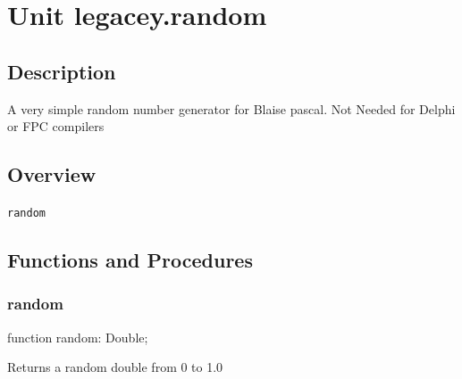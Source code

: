 \documentclass{report}
\newif\ifpdf
\begin{document}
\label{toc}\tableofcontents
\newpage
\newlength{\tmplength}
\chapter{Unit legacey.random}
\label{legacey.random}
\section{Description}
A very simple random number generator for Blaise pascal. Not Needed for Delphi or FPC compilers
\section{Overview}
\begin{description}
\item[\texttt{random}]
\end{description}
\section{Functions and Procedures}
\ifpdf
\subsection*{\large{\textbf{random}}\normalsize\hspace{1ex}\hrulefill}
\else
\subsection*{random}
\fi
\label{legacey.random-random}
\begin{list}{}{
\setlength{\itemindent}{0cm}
\setlength{\listparindent}{0cm}
\setlength{\leftmargin}{\evensidemargin}
\addtolength{\leftmargin}{\tmplength}
\settowidth{\labelsep}{X}
\addtolength{\leftmargin}{\labelsep}
\setlength{\labelwidth}{\tmplength}
}
\item[\textbf{Declaration}\hfill]
\ifpdf
\begin{flushleft}
\fi
\begin{ttfamily}
function random: Double;\end{ttfamily}

\ifpdf
\end{flushleft}
\fi

\par
\item[\textbf{Description}]
Returns a random double from 0 to 1.0

\end{list}
\end{document}
